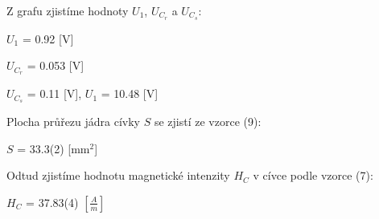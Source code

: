 \documentclass[a4paper,11pt]{article}
\begin{document}
\begin{minipage}[t]{0.5\textwidth}
            \captionsetup{justification=centering, font=footnotesize}
            \label{fig:hcurve}
            \vspace{20pt}
            \raggedright
            Z grafu zjistíme hodnoty $U_1$, $U_C_r$ a $U_C_s$:
            \begin{center}
                $U_1$ = 0.92 [V]
                \vspace{5pt}
                \par $U_C_r$ = 0.053 [V]
                \vspace{5pt}
                \par $U_C_s$ = 0.11 [V], $U_1$ = 10.48 [V]
            \end{center}
            Plocha průřezu jádra cívky $S$ se zjistí ze vzorce (9):
            \begin{center}
                $S$ = 33.3(2) [mm$^2$]
            \end{center}
            Odtud zjistíme hodnotu magnetické intenzity $H_C$ v cívce podle vzorce (7): 
            \begin{center}
                $H_C$ = 37.83(4) $\left[ \frac{A}{m} \right]$
            \end{center}
    \end{minipage}
    \hspace{10pt}
\end{document}
